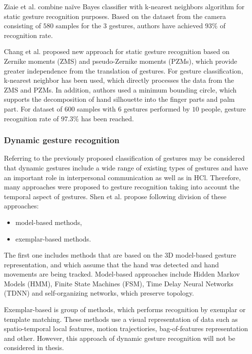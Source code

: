 Ziaie et al. \cite{ziaie-etal-csicc2008-revised} combine naïve Bayes classifier with k-nearest neighbors algorithm for static gesture recognition purposes. Based on the dataset from the camera consisting of $580$ samples for the $3$ gestures, authors have achieved $93\%$ of recognition rate.

Chang et al. \cite{journals/jise/ChangCTH06} proposed new approach for static gesture recognition based on Zernike moments (ZMS) and pseudo-Zernike moments (PZMs), which provide greater independence from the translation of gestures. For gesture classification, k-nearest neighbor has been used, which directly processes the data from the ZMS and PZMs. In addition, authors used a minimum bounding circle, which supports the decomposition of hand silhouette into the finger parts and palm part. For dataset of $600$ samples with $6$ gestures performed by $10$ people, gesture recognition rate of $97.3\%$ has been reached.

\subsubsection{Dynamic gesture recognition}

Referring to the previously proposed classification of gestures may be considered that dynamic gestures include a wide range of existing types of gestures and have an important role in interpersonal communication as well as in HCl. Therefore, many approaches were proposed to gesture recognition taking into account the temporal aspect of gestures. Shen et al. \cite{Shen:2012:DHG:2206425.2206457} propose following division of these approaches:

\begin{itemize}
\item model-based methods,
\item exemplar-based methods.
\end{itemize}

The first one includes methods that are based on the 3D model-based gesture representation, and which assume that the hand was detected and hand movements are being tracked. Model-based approaches include Hidden Markov Models (HMM), Finite State Machines (FSM), Time Delay Neural Networks (TDNN) and self-organizing networks, which preserve topology.

Exemplar-based is group of methods, which performs recognition by exemplar or template matching. These methods use a visual representation of data such as spatio-temporal local features, motion trajectiories, bag-of-features representation and other. However, this approach of dynamic gesture recognition will not be considered in thesis.

